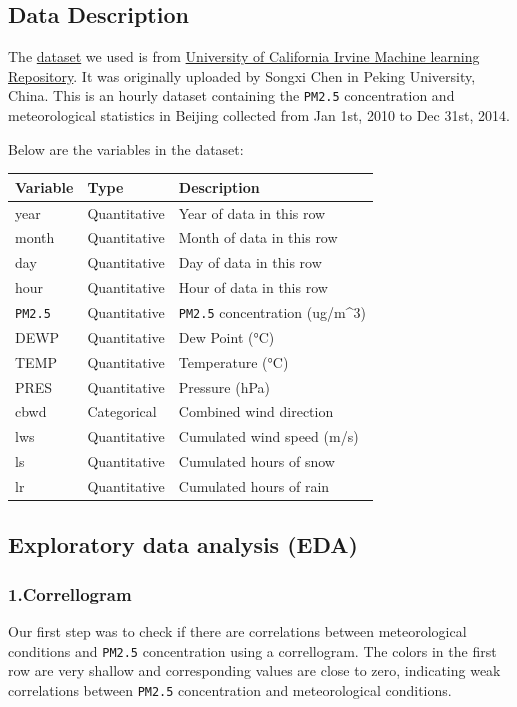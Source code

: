 \documentclass[]{article}
\begin{document}
\hypertarget{data-description}{%
\subsection{Data Description}\label{data-description}}

The
\href{https://archive.ics.uci.edu/ml/machine-learning-databases/00381/PRSA_data_2010.1.1-2014.12.31.csv}{dataset}
we used is from
\href{https://archive.ics.uci.edu/ml/datasets/Beijing+PM2.5+Data\#}{University
of California Irvine Machine learning Repository}. It was originally
uploaded by Songxi Chen in Peking University, China. This is an hourly
dataset containing the \texttt{PM2.5} concentration and meteorological
statistics in Beijing collected from Jan 1st, 2010 to Dec 31st, 2014.

Below are the variables in the dataset:

\begin{longtable}[]{@{}lll@{}}
\toprule
Variable & Type & Description\tabularnewline
\midrule
\endhead
year & Quantitative & Year of data in this row\tabularnewline
month & Quantitative & Month of data in this row\tabularnewline
day & Quantitative & Day of data in this row\tabularnewline
hour & Quantitative & Hour of data in this row\tabularnewline
\texttt{PM2.5} & Quantitative & \texttt{PM2.5} concentration
(ug/m\^{}3)\tabularnewline
DEWP & Quantitative & Dew Point (°C)\tabularnewline
TEMP & Quantitative & Temperature (°C)\tabularnewline
PRES & Quantitative & Pressure (hPa)\tabularnewline
cbwd & Categorical & Combined wind direction\tabularnewline
lws & Quantitative & Cumulated wind speed (m/s)\tabularnewline
ls & Quantitative & Cumulated hours of snow\tabularnewline
lr & Quantitative & Cumulated hours of rain\tabularnewline
\bottomrule
\end{longtable}

\hypertarget{exploratory-data-analysis-eda}{%
\subsection{Exploratory data analysis
(EDA)}\label{exploratory-data-analysis-eda}}

\hypertarget{correllogram}{%
\subsubsection{1.Correllogram}\label{correllogram}}

Our first step was to check if there are correlations between
meteorological conditions and \texttt{PM2.5} concentration using a
correllogram. The colors in the first row are very shallow and
corresponding values are close to zero, indicating weak correlations
between \texttt{PM2.5} concentration and meteorological conditions.
\end{document}
